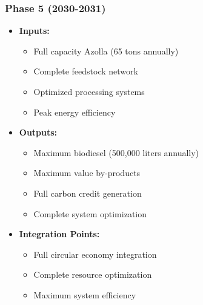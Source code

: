 \subsubsection{Phase 5 (2030-2031)}
\begin{itemize}
    \item \textbf{Inputs:}
    \begin{itemize}
        \item Full capacity Azolla (65 tons annually)
        \item Complete feedstock network
        \item Optimized processing systems
        \item Peak energy efficiency
    \end{itemize}
    \item \textbf{Outputs:}
    \begin{itemize}
        \item Maximum biodiesel (500,000 liters annually)
        \item Maximum value by-products
        \item Full carbon credit generation
        \item Complete system optimization
    \end{itemize}
    \item \textbf{Integration Points:}
    \begin{itemize}
        \item Full circular economy integration
        \item Complete resource optimization
        \item Maximum system efficiency
    \end{itemize}
\end{itemize}
